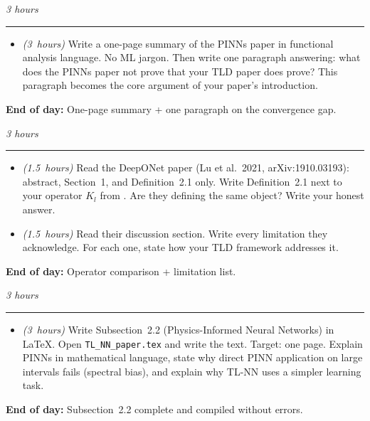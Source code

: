 \documentclass[12pt,a4paper]{article}
\newcommand{\hrs}[1]{\textit{\color{darkgray}(#1~hours)}}
\newcommand{\dayheading}[2]{%
  \vspace{0.3em}
  \noindent{\bfseries\color{darkblue}Day~#1}%
  \hfill{\small\color{darkgray}\textit{#2}}%
  \\[-0.4em]{\color{midgray}\rule{\linewidth}{0.4pt}}%
  \vspace{0.1em}
}
\begin{document}
\begin{tcolorbox}[daystyle]
\dayheading{3}{3 hours}
\begin{itemize}[leftmargin=1.8em,itemsep=3pt]
  \item[\color{midblue}$\bullet$]
    \hrs{3} Write a one-page summary of the PINNs paper in
    functional analysis language. No ML jargon. Then write
    one paragraph answering: what does the PINNs paper not
    prove that your TLD paper does prove? This paragraph
    becomes the core argument of your paper's introduction.
\end{itemize}
\noindent\textbf{End of day:}
One-page summary + one paragraph on the convergence gap.
\end{tcolorbox}

\begin{tcolorbox}[daystyle]
\dayheading{4}{3 hours}
\begin{itemize}[leftmargin=1.8em,itemsep=3pt]
  \item[\color{midblue}$\bullet$]
    \hrs{1.5} Read the DeepONet paper (Lu et al.\ 2021,
    arXiv:1910.03193): abstract, Section~1, and
    Definition~2.1 only. Write Definition~2.1 next to
    your operator $K_l$ from \cite{sedka2025}. Are they
    defining the same object? Write your honest answer.
  \item[\color{midblue}$\bullet$]
    \hrs{1.5} Read their discussion section. Write every
    limitation they acknowledge. For each one, state how
    your TLD framework addresses it.
\end{itemize}
\noindent\textbf{End of day:}
Operator comparison + limitation list.
\end{tcolorbox}

\begin{tcolorbox}[daystyle]
\dayheading{5}{3 hours}
\begin{itemize}[leftmargin=1.8em,itemsep=3pt]
  \item[\color{midblue}$\bullet$]
    \hrs{3} Write Subsection~2.2 (Physics-Informed Neural
    Networks) in \LaTeX. Open \texttt{TL\_NN\_paper.tex}
    and write the text. Target: one page. Explain PINNs
    in mathematical language, state why direct PINN
    application on large intervals fails (spectral bias),
    and explain why TL-NN uses a simpler learning task.
\end{itemize}
\noindent\textbf{End of day:}
Subsection~2.2 complete and compiled without errors.
\end{tcolorbox}
\end{document}
